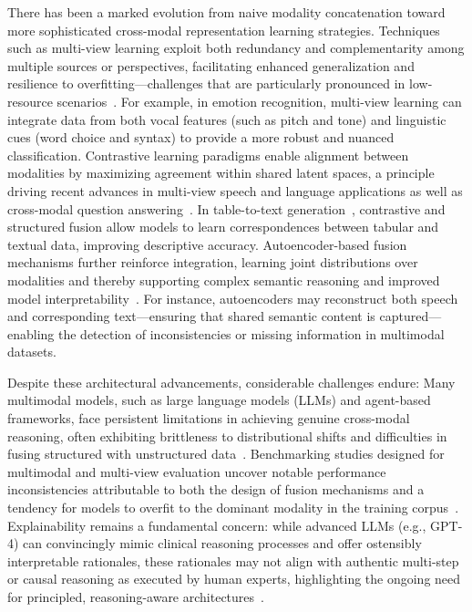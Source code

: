 \documentclass[sigconf]{acmart}
\begin{document}
There has been a marked evolution from naive modality concatenation toward more sophisticated cross-modal representation learning strategies. Techniques such as multi-view learning exploit both redundancy and complementarity among multiple sources or perspectives, facilitating enhanced generalization and resilience to overfitting—challenges that are particularly pronounced in low-resource scenarios~\cite{ref79}. For example, in emotion recognition, multi-view learning can integrate data from both vocal features (such as pitch and tone) and linguistic cues (word choice and syntax) to provide a more robust and nuanced classification. Contrastive learning paradigms enable alignment between modalities by maximizing agreement within shared latent spaces, a principle driving recent advances in multi-view speech and language applications as well as cross-modal question answering~\cite{ref31,ref79}. In table-to-text generation~\cite{ref74}, contrastive and structured fusion allow models to learn correspondences between tabular and textual data, improving descriptive accuracy. Autoencoder-based fusion mechanisms further reinforce integration, learning joint distributions over modalities and thereby supporting complex semantic reasoning and improved model interpretability~\cite{ref79,ref46,ref47}. For instance, autoencoders may reconstruct both speech and corresponding text—ensuring that shared semantic content is captured—enabling the detection of inconsistencies or missing information in multimodal datasets.

Despite these architectural advancements, considerable challenges endure:
Many multimodal models, such as large language models (LLMs) and agent-based frameworks, face persistent limitations in achieving genuine cross-modal reasoning, often exhibiting brittleness to distributional shifts and difficulties in fusing structured with unstructured data~\cite{ref36,ref46,ref49,ref60,ref74,ref90}.
Benchmarking studies designed for multimodal and multi-view evaluation uncover notable performance inconsistencies attributable to both the design of fusion mechanisms and a tendency for models to overfit to the dominant modality in the training corpus~\cite{ref31,ref74,ref80,ref87,ref88}.
Explainability remains a fundamental concern: while advanced LLMs (e.g., GPT-4) can convincingly mimic clinical reasoning processes and offer ostensibly interpretable rationales, these rationales may not align with authentic multi-step or causal reasoning as executed by human experts, highlighting the ongoing need for principled, reasoning-aware architectures~\cite{ref31,ref36,ref49,ref55,ref89}.
\end{document}
